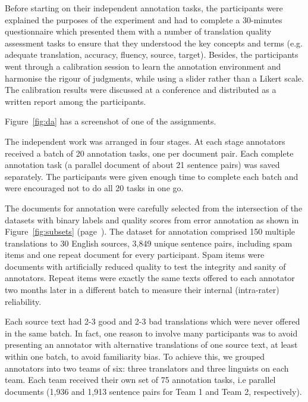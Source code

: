 Before starting on their independent annotation tasks, the participants were explained the purposes of the experiment and had to complete a 30-minutes questionnaire which presented them with a number of translation quality assessment tasks to ensure that they understood the key concepts and terms (e.g. adequate translation, accuracy, fluency, source, target).
Besides, the participants went through a calibration session to learn the annotation environment and harmonise the rigour of judgments, while using a slider rather than a Likert scale. 
The calibration results were discussed at a conference and distributed as a written report among the participants.

Figure~\ref{fig:da} has a screenshot of one of the assignments.


The independent work was arranged in four stages. At each stage annotators received a batch of 20 annotation tasks, one per document pair. Each complete annotation task (a parallel document of about 21 sentence pairs) was saved separately. The participants were given enough time to complete each batch and were encouraged not to do all 20 tasks in one go.

\label{pg:intersection140}
The documents for annotation were carefully selected from the intersection of the datasets with binary labels and quality scores from error annotation as shown in Figure~\ref{fig:subsets} (page~\pageref{pg:subsets}). The dataset for annotation comprised 150 multiple translations to 30 English sources, 3,849 unique sentence pairs, including spam items and one repeat document for every participant. 
Spam items were documents with artificially reduced quality to test the integrity and sanity of annotators. Repeat items were exactly the same texts offered to each annotator two months later in a different batch to measure their internal (intra-rater) reliability.

Each source text had 2-3 good and 2-3 bad translations which were never offered in the same batch. In fact, one reason to involve many participants was to avoid presenting an annotator with alternative translations of one source text, at least within one batch, to avoid familiarity bias. To achieve this, we grouped annotators into two teams of six: three translators and three linguists on each team. Each team received their own set of 75 annotation tasks, i.e parallel documents (1,936 and 1,913 sentence pairs for Team 1 and Team 2, respectively). 

